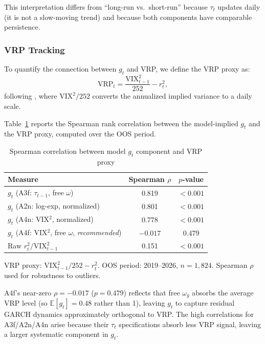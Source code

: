 \documentclass[12pt,a4paper]{article}
\newcommand{\E}{\mathbb{E}}
\begin{document}
This interpretation differs from ``long-run vs.\ short-run'' because $\tau_t$ updates daily (it is not a slow-moving trend) and because both components have comparable persistence.

\subsubsection{VRP Tracking}

To quantify the connection between $g_t$ and VRP, we define the VRP proxy as:
\begin{equation}
\mathrm{VRP}_t = \frac{\mathrm{VIX}_{t-1}^2}{252} - r_t^2,
\label{eq:vrp_proxy}
\end{equation}
following \citet{bollerslev2009}, where $\mathrm{VIX}^2/252$ converts the annualized implied variance to a daily scale.

Table~\ref{tab:vrp_corr} reports the Spearman rank correlation between the model-implied $g_t$ and the VRP proxy, computed over the OOS period.

\begin{table}[H]
\centering
\caption{Spearman correlation between model $g_t$ component and VRP proxy}
\label{tab:vrp_corr}
\begin{threeparttable}
\begin{tabular}{@{}lcc@{}}
\toprule
Measure & Spearman $\rho$ & $p$-value \\
\midrule
$g_t$ (A3f: $\tau_{t-1}$, free $\omega$) & 0.819 & $< 0.001$ \\
$g_t$ (A2n: log-exp, normalized) & 0.801 & $< 0.001$ \\
$g_t$ (A4n: VIX$^2$, normalized) & 0.778 & $< 0.001$ \\
$g_t$ (A4f: VIX$^2$, free $\omega$, \textit{recommended}) & $-0.017$ & 0.479 \\
Raw $r_t^2 / \mathrm{VIX}_{t-1}^2$ & 0.151 & $< 0.001$ \\
\bottomrule
\end{tabular}
\begin{tablenotes}
\footnotesize
\item VRP proxy: $\mathrm{VIX}_{t-1}^2/252 - r_t^2$. OOS period: 2019--2026, $n = 1{,}824$. Spearman $\rho$ used for robustness to outliers.
\item A4f's near-zero $\rho = -0.017$ ($p = 0.479$) reflects that free $\omega_g$ absorbs the average VRP level (so $\E[g_t] = 0.48$ rather than 1), leaving $g_t$ to capture residual GARCH dynamics approximately orthogonal to VRP. The high correlations for A3f/A2n/A4n arise because their $\tau_t$ specifications absorb less VRP signal, leaving a larger systematic component in $g_t$.
\end{tablenotes}
\end{threeparttable}
\end{table}
\end{document}
